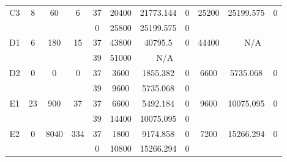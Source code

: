 \begin{sidewaystable}
\begin{tabular}{c||c|c|c||c|c|c|c||c|c|c}
         &
        
      \\
      \hline
      \multirow{2}{*}{C3} &
      \multirow{2}{*}{8} &
      \multirow{2}{*}{60} &
      \multirow{2}{*}{6} &
      37 &
      20400 &
        21773.144 &
        0 &
      \multirow{2}{*}{25200} &
        \multirow{2}{*}{25199.575} &
        \multirow{2}{*}{0}
      \\
      \cline{5-8}
       &
       &
       &
       &
      0 &
      25800 &
        25199.575 &
        0 &
      
         &
        
      \\
      \hline
      \multirow{2}{*}{D1} &
      \multirow{2}{*}{6} &
      \multirow{2}{*}{180} &
      \multirow{2}{*}{15} &
      37 &
      43800 &
        40795.5 &
        0 &
      \multirow{2}{*}{44400} &
        \multicolumn{2}{c}{\multirow{2}{*}{N/A}}
      \\
      \cline{5-8}
       &
       &
       &
       &
      39 &
      51000 &
        \multicolumn{2}{|c||}{N/A} &
      
        
      \\
      \hline
      \multirow{2}{*}{D2} &
      \multirow{2}{*}{0} &
      \multirow{2}{*}{0} &
      \multirow{2}{*}{0} &
      37 &
      3600 &
        1855.382 &
        0 &
      \multirow{2}{*}{6600} &
        \multirow{2}{*}{5735.068} &
        \multirow{2}{*}{0}
      \\
      \cline{5-8}
       &
       &
       &
       &
      39 &
      9600 &
        5735.068 &
        0 &
      
         &
        
      \\
      \hline
      \multirow{2}{*}{E1} &
      \multirow{2}{*}{23} &
      \multirow{2}{*}{900} &
      \multirow{2}{*}{37} &
      37 &
      6600 &
        5492.184 &
        0 &
      \multirow{2}{*}{9600} &
        \multirow{2}{*}{10075.095} &
        \multirow{2}{*}{0}
      \\
      \cline{5-8}
       &
       &
       &
       &
      39 &
      14400 &
        10075.095 &
        0 &
      
         &
        
      \\
      \hline
      \multirow{2}{*}{E2} &
      \multirow{2}{*}{0} &
      \multirow{2}{*}{8040} &
      \multirow{2}{*}{334} &
      37 &
      1800 &
        9174.858 &
        0 &
      \multirow{2}{*}{7200} &
        \multirow{2}{*}{15266.294} &
        \multirow{2}{*}{0}
      \\
      \cline{5-8}
       &
       &
       &
       &
      0 &
      10800 &
        15266.294 &
        0 &
      

\end{tabular}
\end{sidewaystable}
